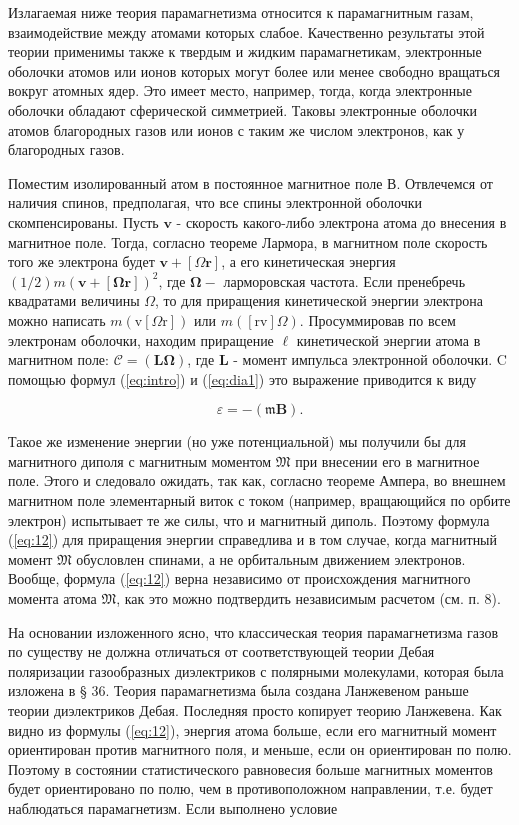 \documentclass[12pt]{article}
\begin{document}
  Излагаемая ниже теория парамагнетизма относится к парамагнитным газам, взаимодействие между атомами которых слабое. Качественно результаты этой теории применимы также к твердым и жидким парамагнетикам, электронные оболочки атомов или ионов которых могут более или менее свободно вращаться вокруг атомных ядер. Это имеет место, например, тогда, когда электронные оболочки обладают сферической симметрией. Таковы электронные оболочки атомов благородных газов или ионов с таким же числом электронов, как у благородных газов.

  Поместим изолированный атом в постоянное магнитное поле В. Отвлечемся от наличия спинов, предполагая, что все спины электронной оболочки скомпенсированы. Пусть $\mathbf{v}$ - скорость какого-либо электрона атома до внесения в магнитное поле. Тогда, согласно теореме Лармора, в магнитном поле скорость того же электрона будет $\mathbf{v}+[\Omega \mathbf{r}]$, а его кинетическая энергия $(1 / 2) m(\mathbf{v}+[\boldsymbol{\Omega r}])^2$, где $\boldsymbol{\Omega}-$ ларморовская частота. Если пренебречь квадратами величины $\Omega$, то для приращения кинетической энергии электрона можно написать $m(\mathrm{v}[\Omega \mathrm{r}])$ или $m([\mathrm{rv}] \Omega)$. Просуммировав по всем электронам оболочки, находим приращение $\mathscr{\ell}$ кинетической энергии атома в магнитном поле: $\mathcal{C}=(\mathbf{L} \boldsymbol{\Omega})$, где $\mathbf{L}$ - момент импульса электронной оболочки. C помощью формул (\ref{eq:intro}) и (\ref{eq:dia1}) это выражение приводится к виду

  \begin{equation}
  \label{eq:12}
  \mathscr{\varepsilon}=-(\mathfrak{m} \mathbf{B}) .
  \end{equation}

  Такое же изменение энергии (но уже потенциальной) мы получили бы для магнитного диполя с магнитным моментом $\mathfrak{M}$ при внесении его в магнитное поле. Этого и следовало ожидать, так как, согласно теореме Ампера, во внешнем магнитном поле элементарный виток с током (например, вращающийся по орбите электрон) испытывает те же силы, что и магнитный диполь. Поэтому формула (\ref{eq:12}) для приращения энергии справедлива и в том случае, когда магнитный момент $\mathfrak{M}$ обусловлен спинами, а не орбитальным движением электронов. Вообще, формула (\ref{eq:12}) верна независимо от происхождения магнитного момента атома $\mathfrak{M}$, как это можно подтвердить независимым расчетом (см. п. 8).

  На основании изложенного ясно, что классическая теория парамагнетизма газов по существу не должна отличаться от соответствующей теории Дебая поляризации газообразных диэлектриков с полярными молекулами, которая была изложена в § 36. Теория парамагнетизма была создана Ланжевеном раньше теории диэлектриков Дебая. Последняя просто копирует теорию Ланжевена. Как видно из формулы (\ref{eq:12}), энергия атома больше, если его магнитный момент ориентирован против магнитного поля, и меньше, если он ориентирован по полю. Поэтому в состоянии статистического равновесия больше магнитных моментов будет ориентировано по полю, чем в противоположном направлении, т.е. будет наблюдаться парамагнетизм. Если выполнено условие
\end{document}
